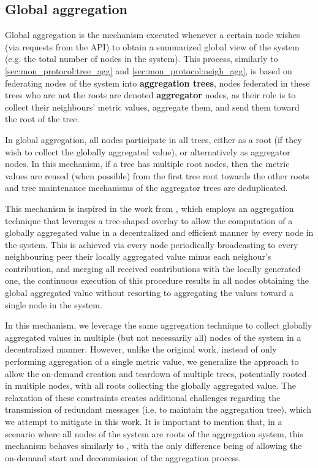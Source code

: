 
\subsection{Global aggregation} \label{sec:mon_protocol:global_agg}

Global aggregation is the mechanism executed whenever a certain node wishes (via requests from the API) to obtain a summarized global view of the system (e.g. the total number of nodes in the system). This process, similarly to \ref{sec:mon_protocol:tree_agg} and \ref{sec:mon_protocol:neigh_agg}, is based on federating nodes of the system into \textbf{aggregation trees}, nodes federated in these trees who are not the roots are denoted \textbf{aggregator} nodes, as their role is to collect their neighbours' metric values, aggregate them, and send them toward the root of the tree.

In global aggregation, all nodes participate in all trees, either as a root (if they wish to collect the globally aggregated value), or alternatively as aggregator nodes. In this mechanism, if a tree has multiple root nodes, then the metric values are reused (when possible) from the first tree root towards the other roots and tree maintenance mechanisms of the aggregator trees are deduplicated. 

This mechanism is inspired in the work from , which employs an aggregation technique that leverages a tree-shaped overlay to allow the computation of a globally aggregated value in a decentralized and efficient manner by every node in the system. This is achieved via every node periodically broadcasting to every neighbouring peer their locally aggregated value minus each neighour's contribution, and merging all received contributions with the locally generated one, the continuous execution of this procedure results in all nodes obtaining the global aggregated value without resorting to aggregating the values toward a single node in the system.

In this mechanism, we leverage the same aggregation technique to collect globally aggregated values in multiple (but not necessarily all) nodes of the system in a decentralized manner. However, unlike the original work, instead of only performing aggregation of a single metric value, we generalize the approach to allow the on-demand creation and teardown of multiple trees, potentially rooted in multiple nodes, with all roots collecting the globally aggregated value. The relaxation of these constraints creates additional challenges regarding the transmission of redundant messages (i.e. to maintain the aggregation tree), which we attempt to mitigate in this work. It is important to mention that, in a scenario where all nodes of the system are roots of the aggregation system, this mechanism behaves similarly to , with the only difference being of allowing the on-demand start and decommission of the aggregation process.

